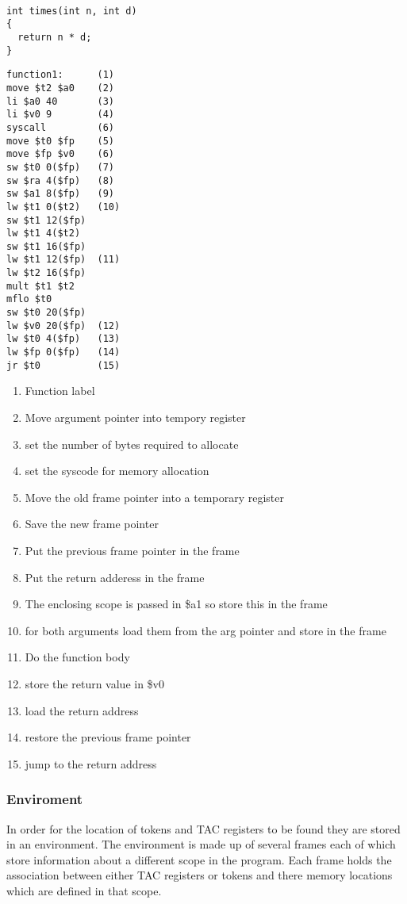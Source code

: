 \documentclass{article}
\begin{document}
\begin{minipage}{0.4\textwidth}
\begin{lstlisting}

int times(int n, int d)
{
  return n * d;
}

\end{lstlisting}
\end{minipage}%
\begin{minipage}{0.6\textwidth}
\begin{lstlisting}
function1:      (1)
move $t2 $a0    (2)
li $a0 40       (3)
li $v0 9        (4)
syscall         (6)
move $t0 $fp    (5)
move $fp $v0    (6)
sw $t0 0($fp)   (7)
sw $ra 4($fp)   (8)
sw $a1 8($fp)   (9)
lw $t1 0($t2)   (10)
sw $t1 12($fp)
lw $t1 4($t2)
sw $t1 16($fp)
lw $t1 12($fp)  (11)
lw $t2 16($fp)
mult $t1 $t2
mflo $t0
sw $t0 20($fp)
lw $v0 20($fp)  (12)
lw $t0 4($fp)   (13)
lw $fp 0($fp)   (14)
jr $t0          (15)
\end{lstlisting}
\end{minipage}%

\begin{enumerate}
\item Function label
\item Move argument pointer into tempory register
\item set the number of bytes required to allocate
\item set the syscode for memory allocation
\item Move the old frame pointer into a temporary register
\item Save the new frame pointer
\item Put the previous frame pointer in the frame
\item Put the return adderess in the frame
\item The enclosing scope is passed in \$a1 so store this in the frame
\item for both arguments load them from the arg pointer and store in the frame
\item Do the function body
\item store the return value in \$v0
\item load the return address
\item restore the previous frame pointer
\item jump to the return address
\end{enumerate}

\subsubsection{Enviroment}
In order for the location of tokens and TAC registers to be found they are stored
in an environment. The environment is made up of several frames each of which store
information about a different scope in the program. Each frame holds the association
between either TAC registers or tokens and there memory locations which are defined
in that scope.
\end{document}
